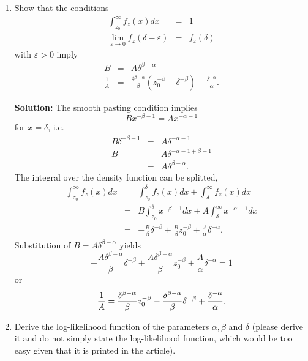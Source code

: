 \documentclass{article}
\begin{document}
\begin{enumerate}
\item Show that the conditions%
\begin{eqnarray*}
\int_{z_{0}}^{\infty }f_{z}(x)dx &=&1 \\
\lim_{\varepsilon \rightarrow 0}f_{z}(\delta -\varepsilon ) &=&f_{z}(\delta )
\end{eqnarray*}%
with $\varepsilon >0$ imply%
\begin{eqnarray*}
B &=&A\delta ^{\beta -\alpha } \\
\frac{1}{A} &=&\frac{\delta ^{\beta -\alpha }}{\beta }\left( z_{0}^{-\beta
}-\delta ^{-\beta }\right) +\frac{\delta ^{-\alpha }}{\alpha }.
\end{eqnarray*}

\textbf{Solution:} The smooth pasting condition implies 
\begin{equation*}
Bx^{-\beta -1}=Ax^{-\alpha -1}
\end{equation*}%
for $x=\delta $, i.e.%
\begin{eqnarray*}
B\delta ^{-\beta -1} &=&A\delta ^{-\alpha -1} \\
B &=&A\delta ^{-\alpha -1+\beta +1} \\
&=&A\delta ^{\beta -\alpha }.
\end{eqnarray*}%
The integral over the density function can be splitted,%
\begin{eqnarray*}
\int_{z_{0}}^{\infty }f_{z}(x)dx &=&\int_{z_{0}}^{\delta
}f_{z}(x)dx+\int_{\delta }^{\infty }f_{z}(x)dx \\
&=&B\int_{z_{0}}^{\delta }x^{-\beta -1}dx+A\int_{\delta }^{\infty
}x^{-\alpha -1}dx \\
&=&-\frac{B}{\beta }\delta ^{-\beta }+\frac{B}{\beta }z_{0}^{-\beta }+\frac{A%
}{\alpha }\delta ^{-\alpha }.
\end{eqnarray*}%
Substitution of $B=A\delta ^{\beta -\alpha }$ yields%
\begin{equation*}
-\frac{A\delta ^{\beta -\alpha }}{\beta }\delta ^{-\beta }+\frac{A\delta
^{\beta -\alpha }}{\beta }z_{0}^{-\beta }+\frac{A}{\alpha }\delta ^{-\alpha
}=1
\end{equation*}%
or%
\begin{equation*}
\frac{1}{A}=\frac{\delta ^{\beta -\alpha }}{\beta }z_{0}^{-\beta }-\frac{%
\delta ^{\beta -\alpha }}{\beta }\delta ^{-\beta }+\frac{\delta ^{-\alpha }}{%
\alpha }.
\end{equation*}

\item Derive the log-likelihood function of the parameters $\alpha ,\beta $
and $\delta $ (please derive it and do not simply state the log-likelihood
function, which would be too easy given that it is printed in the article).


\end{enumerate}
\end{document}
